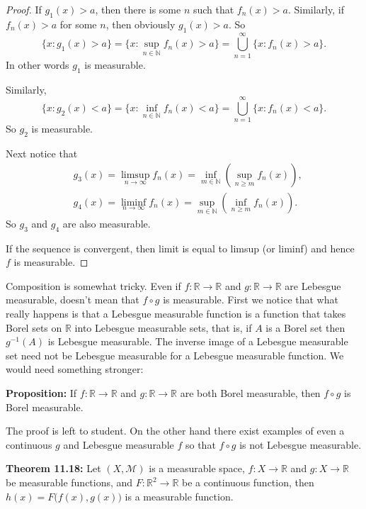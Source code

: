 \documentclass[12pt]{book}
\newcommand{\R}{{\mathbb{R}}}
\newcommand{\N}{{\mathbb{N}}}
\newcommand{\sM}{{\mathcal{M}}}
\theoremstyle{plain}
\theoremstyle{remark}
\theoremstyle{definition}
\theoremstyle{exercise}
\theoremstyle{example}
\begin{document}
\begin{proof}
If $g_1(x) > a$, then there is some $n$ such that
$f_n(x) > a$.  Similarly, if $f_n(x) > a$ for some $n$,
then obviously $g_1(x) > a$.  So
$$
\{ x : g_1(x) > a \}
=
\{ x : \sup_{n \in \N} f_n(x) > a \}
= \bigcup_{n=1}^\infty \{ x : f_n(x) > a \} .
$$
In other words $g_1$ is measurable.

Similarly,
$$
\{ x : g_2(x) < a \}
=
\{ x : \inf_{n \in \N} f_n(x) < a \}
= \bigcup_{n=1}^\infty \{ x : f_n(x) < a \} .
$$
So $g_2$ is measurable.

Next notice that
\begin{align*}
& g_3(x) =
\limsup_{n \to \infty} f_n(x)
=
\inf_{m \in \N} \left( \sup_{n \geq m} f_n(x) \right) ,
\\
& g_4(x) =
\liminf_{n \to \infty} f_n(x)
=
\sup_{m \in \N} \left( \inf_{n \geq m} f_n(x) \right) .
\end{align*}
So $g_3$ and $g_4$ are also measurable.

If the sequence is convergent, then limit is equal to limsup (or liminf) and
hence $f$ is measurable.
\end{proof}

Composition is somewhat tricky.  Even if $f \colon \R \to \R$ and
$g \colon \R \to \R$ are Lebesgue
measurable, doesn't mean that $f \circ g$ is measurable.
First we notice that what really happens is that a Lebesgue
measurable function
is a function that takes Borel sets on $\R$ into Lebesgue measurable
sets, that is, if $A$ is a Borel set
then $g^{-1}(A)$ is Lebesgue measurable.
The inverse image of a Lebesgue measurable set need not be Lebesgue measurable
for a Lebesgue measurable function.  We would need something stronger:

\medskip

\textbf{Proposition:}
If $f \colon \R \to \R$ and
$g \colon \R \to \R$ are both Borel measurable, then $f \circ g$
is Borel measurable.

\medskip

The proof is left to student.
On the other hand there exist
examples of even a continuous $g$ and Lebesgue measurable $f$
so that $f \circ g$ is not Lebesgue measurable.

\medskip

\textbf{Theorem 11.18:}
Let $(X,\sM)$ is a measurable space,
$f \colon X \to \R$ and $g \colon X \to \R$ be measurable functions,
and $F \colon \R^2 \to \R$ be a continuous function, then
$h(x) = F\bigl(f(x),g(x)\bigr)$ is a measurable function.
\end{document}
